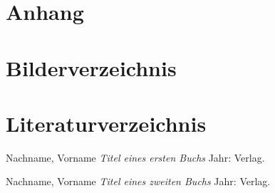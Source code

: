 \documentclass[12pt,a4paper]{article} %
\begin{document}
\section{Anhang}
\newpage





\section{Bilderverzeichnis}
\listoffigures



\newpage
\section{Literaturverzeichnis}

\begin{thebibliography}{1} %


 Nachname, Vorname {\em Titel eines ersten Buchs} Jahr: Verlag.

 Nachname, Vorname {\em Titel eines zweiten Buchs} Jahr: Verlag.



\end{thebibliography}
\end{document}
